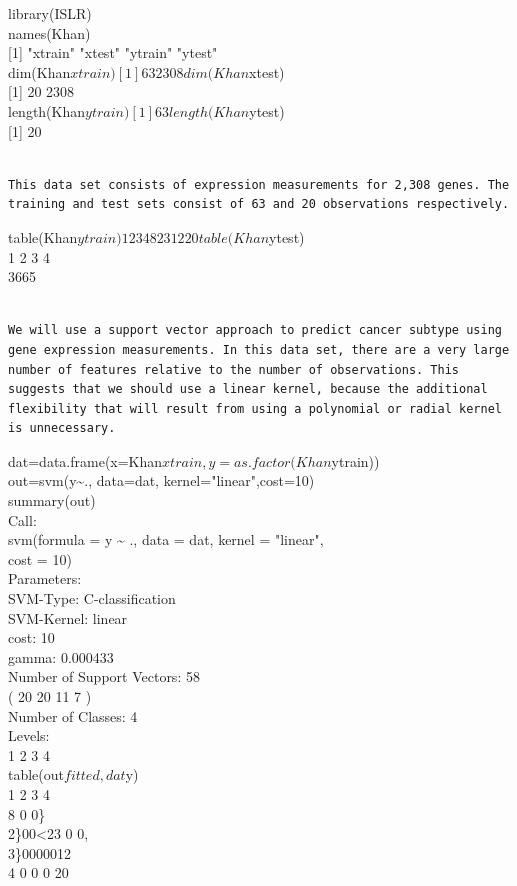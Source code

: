 \documentclass[10pt]{article}
\begin{document}
\begin{displayquote}
library(ISLR)\\
names(Khan)\\[0pt]
[1] "xtrain" "xtest" "ytrain" "ytest"\\
dim(Khan$xtrain)
[1] 63 2308
dim(Khan$xtest)\\[0pt]
[1] 20 2308\\
length(Khan$ytrain)
[1] 63
length(Khan$ytest)\\[0pt]
[1] 20
\end{displayquote}

\begin{verbatim}

This data set consists of expression measurements for 2,308 genes. The training and test sets consist of 63 and 20 observations respectively.
\end{verbatim}

\begin{displayquote}
table(Khan$ytrain)
    1 2 3 4
8 23 12 20
table(Khan$ytest)\\
1 2 3 4\\
3665
\end{displayquote}

\begin{verbatim}

We will use a support vector approach to predict cancer subtype using gene expression measurements. In this data set, there are a very large number of features relative to the number of observations. This suggests that we should use a linear kernel, because the additional flexibility that will result from using a polynomial or radial kernel is unnecessary.
\end{verbatim}

\begin{displayquote}
dat=data.frame(x=Khan$xtrain, y=as.factor(Khan$ytrain))\\
out=svm(y\~{}., data=dat, kernel="linear",cost=10)\\
summary(out)\\
Call:\\
svm(formula = y \~{} ., data = dat, kernel = "linear",\\
cost = 10)\\
Parameters:\\
SVM-Type: C-classification\\
SVM-Kernel: linear\\
cost: 10\\
gamma: 0.000433\\
Number of Support Vectors: 58\\
( 20 20 11 7 )\\
Number of Classes: 4\\
Levels:\\
1 2 3 4\\
table(out$fitted, dat$y)\\
1 2 3 4\\
8 0 0\}\\
2\}00<23 0 0,\\
3\}0000012\\
4 0 0 0 20
\end{displayquote}
\end{document}
